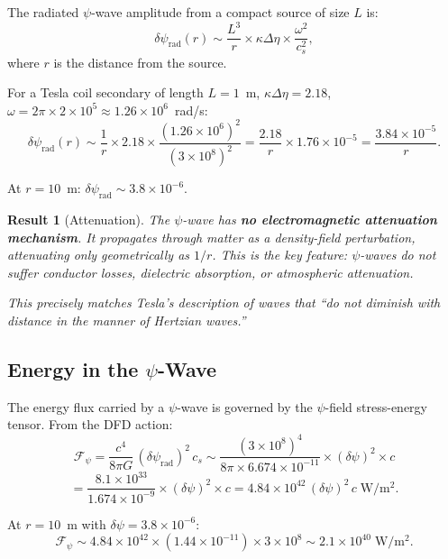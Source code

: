 \documentclass[11pt,a4paper]{article}
\newtheorem{result}{Result}
\begin{document}
The radiated $\psi$-wave amplitude from a compact source of size $L$ is:
\begin{equation}
\delta\psi_{\mathrm{rad}}(r) \sim \frac{L^3}{r} \times \kappa \Delta\eta
\times \frac{\omega^2}{c_s^2},
\end{equation}
where $r$ is the distance from the source.

For a Tesla coil secondary of length $L = 1$~m, $\kappa\Delta\eta = 2.18$,
$\omega = 2\pi \times 2 \times 10^5 \approx 1.26 \times 10^6$~rad/s:
\begin{equation}
\delta\psi_{\mathrm{rad}}(r) \sim \frac{1}{r} \times 2.18
\times \frac{(1.26 \times 10^6)^2}{(3 \times 10^8)^2}
= \frac{2.18}{r} \times 1.76 \times 10^{-5}
= \frac{3.84 \times 10^{-5}}{r}.
\end{equation}

At $r = 10$~m: $\delta\psi_{\mathrm{rad}} \sim 3.8 \times 10^{-6}$.

\begin{result}[Attenuation]
The $\psi$-wave has \textbf{no electromagnetic attenuation mechanism}. It propagates
through matter as a density-field perturbation, attenuating only geometrically as $1/r$.
This is the key feature: $\psi$-waves do not suffer conductor losses, dielectric
absorption, or atmospheric attenuation.

This precisely matches Tesla's description of waves that ``do not diminish with distance
in the manner of Hertzian waves.''
\end{result}

\subsection{Energy in the $\psi$-Wave}

The energy flux carried by a $\psi$-wave is governed by the $\psi$-field
stress-energy tensor. From the DFD action:
\begin{equation}
\mathcal{F}_\psi = \frac{c^4}{8\pi G}\,(\delta\psi_{\mathrm{rad}})^2\,c_s
\sim \frac{(3 \times 10^8)^4}{8\pi \times 6.674 \times 10^{-11}}
\times (\delta\psi)^2 \times c
\end{equation}
\begin{equation}
= \frac{8.1 \times 10^{33}}{1.674 \times 10^{-9}} \times (\delta\psi)^2 \times c
= 4.84 \times 10^{42}\,(\delta\psi)^2\,c\;\mathrm{W/m^2}.
\end{equation}

At $r = 10$~m with $\delta\psi = 3.8 \times 10^{-6}$:
\begin{equation}
\mathcal{F}_\psi \sim 4.84 \times 10^{42} \times (1.44 \times 10^{-11}) \times 3 \times 10^8
\sim 2.1 \times 10^{40}\;\mathrm{W/m^2}.
\end{equation}
\end{document}
